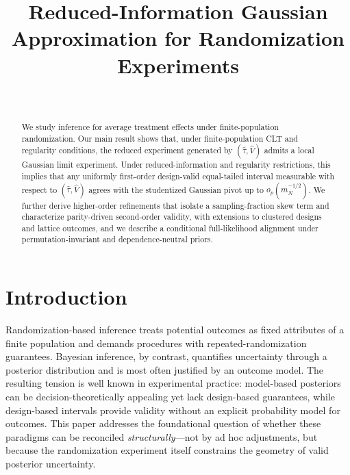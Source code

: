 \documentclass[aos]{imsart}
\theoremstyle{definition}
\theoremstyle{plain}
\begin{document}
\begin{frontmatter}
\title{Reduced-Information Gaussian Approximation for Randomization Experiments}

\begin{aug}
\author[A]{~}
\address[A]{School of Information Technology and Engineering, Kazakh-British Technical University, Almaty, Kazakhstan}
\end{aug}

\begin{abstract}
We study inference for average treatment effects under finite-population randomization. Our main result shows that, under finite-population CLT and regularity conditions, the reduced experiment generated by $(\hat\tau,\hat V)$ admits a local Gaussian limit experiment. Under reduced-information and regularity restrictions, this implies that any uniformly first-order design-valid equal-tailed interval measurable with respect to $(\hat\tau,\hat V)$ agrees with the studentized Gaussian pivot up to $o_p(m_N^{-1/2})$. We further derive higher-order refinements that isolate a sampling-fraction skew term and characterize parity-driven second-order validity, with extensions to clustered designs and lattice outcomes, and we describe a conditional full-likelihood alignment under permutation-invariant and dependence-neutral priors.
\end{abstract}

\begin{keyword}[class=MSC]
\end{keyword}

\begin{keyword}
\end{keyword}
\end{frontmatter}

\section{Introduction}

Randomization-based inference treats potential outcomes as fixed attributes of a finite population and demands procedures with repeated-randomization guarantees. Bayesian inference, by contrast, quantifies uncertainty through a posterior distribution and is most often justified by an outcome model. The resulting tension is well known in experimental practice: model-based posteriors can be decision-theoretically appealing yet lack design-based guarantees, while design-based intervals provide validity without an explicit probability model for outcomes. This paper addresses the foundational question of whether these paradigms can be reconciled \emph{structurally}---not by ad hoc adjustments, but because the randomization experiment itself constrains the geometry of valid posterior uncertainty.
\end{document}
